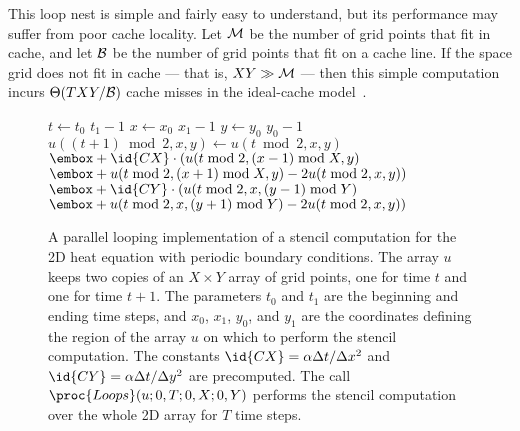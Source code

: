 This loop nest is simple and fairly easy to understand, but its
performance may suffer from poor cache locality.  Let $\cal M$ be the
number of grid points that fit in cache, and let $\cal B$ be the
number of grid points that fit on a cache line.  If the space grid
does not fit in cache --- that is, $XY\gg \cal M$ --- then this simple
computation incurs $\Theta(TXY/\cal B)$ cache misses in the
ideal-cache model~\cite{FrigoLePr99}.

\begin{figure}
\small
\begin{codebox}
\li       \For $t \gets t_0$ \To $t_1-1$ 
\li          \Do \Parfor $x \gets x_0$ \To $x_1-1$
\li             \Do \Parfor $y \gets y_0$ \To $y_0-1$
\li                 \Do $u((t+1)\bmod 2,x,y) \gets u(t\bmod 2,x,y) $
\zi  $\embox + \id{CX}\cdot ( u(t\bmod 2, (x-1)\bmod X, y) $
\zi  $\embox + u(t\bmod 2, (x+1)\bmod X, y) -2 u (t\bmod 2, x, y) ) $
\zi  $\embox + \id{CY}\cdot ( u(t\bmod 2, x, (y-1)\bmod Y) $
\zi  $\embox + u(t\bmod 2, x, (y+1)\bmod Y) -2u(t\bmod 2, x, y) )$
\End\End\End
\end{codebox}

\caption{A parallel looping implementation of a stencil computation
  for the 2D heat equation with periodic boundary conditions.  The
  array $u$ keeps two copies of an $X\times Y$ array of grid points,
  one for time $t$ and one for time $t+1$.  The parameters $t_0$ and
  $t_1$ are the beginning and ending time steps, and $x_0$, $x_1$,
  $y_0$, and $y_1$ are the coordinates defining the region of the
  array $u$ on which to perform the stencil computation.  The
  constants $\id{CX}=\alpha \Delta t/\Delta x^2$ and $\id{CY}=\alpha
  \Delta t/\Delta y^2$ are precomputed.  The call $\proc{Loops}(u; 0,
  T; 0, X; 0, Y)$ performs the stencil computation over the whole 2D
  array for $T$ time steps.}
\label{fig:loops-code}
\end{figure}

